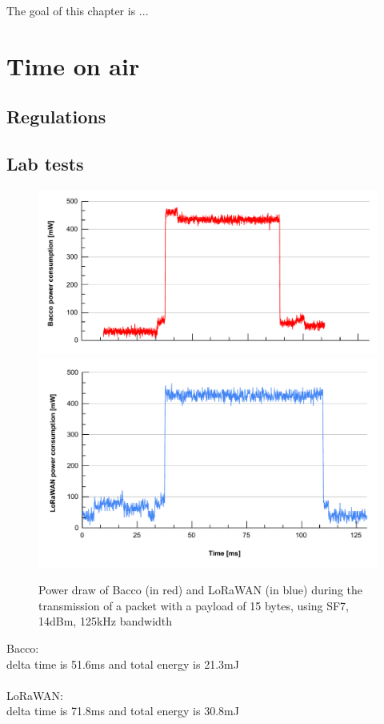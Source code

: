 
The goal of this chapter is ...

\section{Time on air}

\subsection{Regulations}

\subsection{Lab tests}

\begin{figure}[ht]
    \centering
    \includegraphics[width=1.0\textwidth]{images/bacco_SF7_14dbm_125khz_power.pdf}\\
    \vspace{-0.7cm}
    \includegraphics[width=1.0\textwidth]{images/lorawan_SF7_14dbm_125khz_power.pdf}
    \caption{Power draw of Bacco (in red) and LoRaWAN (in blue) during the transmission of a packet with a payload of 15
    bytes, using SF7, 14dBm, 125kHz bandwidth}
    \label{bacco SF7}
\end{figure}

Bacco:\\
delta time is 51.6ms and total energy is 21.3mJ
\\\\
LoRaWAN:\\
delta time is 71.8ms and total energy is 30.8mJ
